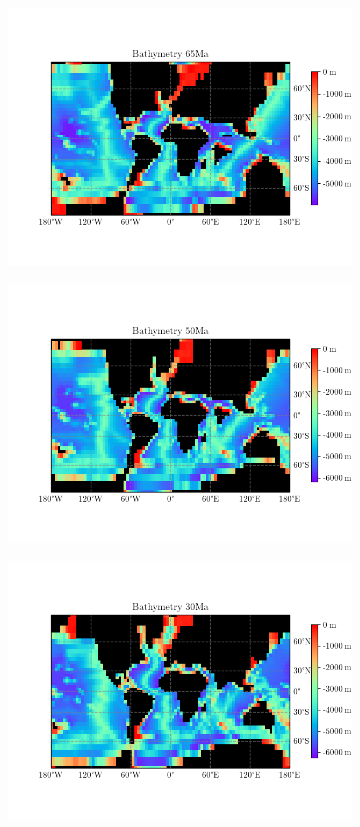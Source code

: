 \documentclass[a4paper]{article}
\begin{document}
\begin{figure}[H]
\begin{subfigure}{.5\textwidth}
	\includegraphics[width=0.9\linewidth]{bathymetry/baath_65.png}
	\label{fig:paleo_begin}
\end{subfigure}
\begin{subfigure}{.5\textwidth}
	\centering
	\includegraphics[width=0.9\linewidth]{bathymetry/baath_50.png}
	\label{fig:paleo_end}
\end{subfigure}
\begin{subfigure}{.5\textwidth}
	\centering
	\includegraphics[width=0.9\linewidth]{bathymetry/baath_30.png}

\end{subfigure}
\end{figure}
\end{document}
